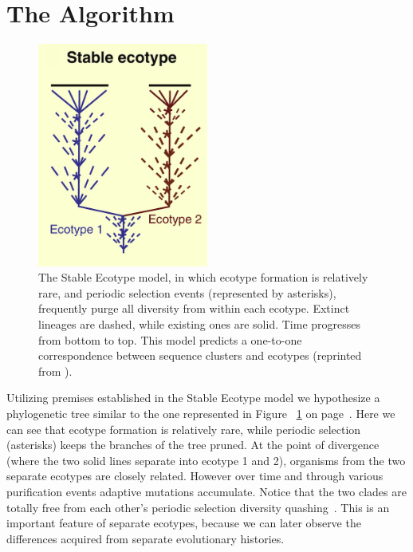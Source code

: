 \section{The Algorithm}

\begin{figure}
 \caption[Phylogenetic tree representation of typical Stable Ecotype model case.]{ The Stable Ecotype model, in which ecotype formation is relatively rare, and periodic selection events (represented by asterisks), frequently purge all diversity from within each ecotype. Extinct lineages are dashed, while existing ones are solid. Time progresses from bottom to top. This model predicts a one-to-one correspondence between sequence clusters and ecotypes (reprinted from \protect\cite{cohan2008origins}). }
 \centering
 \label{fig:StableTree}
 \includegraphics[width=0.5\textwidth]{images/StableTree-CH2}
\end{figure}

Utilizing premises established in the Stable Ecotype model we hypothesize a phylogenetic tree similar to the one represented in Figure ~\ref{fig:StableTree} on page~\pageref{fig:StableTree}.
Here we can see that ecotype formation is relatively rare, while periodic selection (asterisks) keeps the branches of the tree pruned.
At the point of divergence (where the two solid lines separate into ecotype 1 and 2), organisms from the two separate ecotypes are closely related.
However over time and through various purification events adaptive mutations accumulate.
Notice that the two clades are totally free from each other's periodic selection diversity quashing~\cite{cohan2007systematics}.
This is an important feature of separate ecotypes, because we can later observe the differences acquired from separate evolutionary histories.

